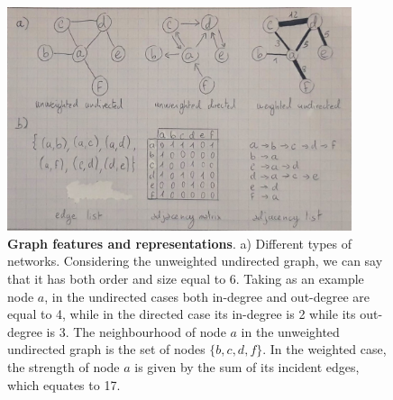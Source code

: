 \begin{figure}[hb]
  \centering
  \includegraphics[width=0.9\textwidth]{networks.jpeg}
  \caption{\textbf{Graph features and representations}. a) Different types of networks. Considering the unweighted undirected graph, we can say that it has both order and size equal to 6. Taking as an example node $a$, in the undirected cases both in-degree and out-degree are equal to 4, while in the directed case its in-degree is 2 while its out-degree is 3. The neighbourhood of node $a$ in the unweighted undirected graph is the set of nodes $\{b,c,d,f\}$. In the weighted case, the strength of node $a$ is given by the sum of its incident edges, which equates to 17.}
  \label{fig:networks}
\end{figure}

